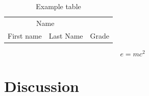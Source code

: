 \documentclass[a4paper,12pt]{article}
\begin{document}
\begin{table}[H]
\caption{Example table}
\centering
\begin{tabular}{llr}
\toprule
\multicolumn{2}{c}{Name} \\
\cmidrule(r){1-2}
First name & Last Name & Grade \\
\midrule
\bottomrule
\end{tabular}
\end{table}


\begin{equation}
\label{eq:emc}
e = mc^2
\end{equation}



\section{Discussion}


\clearpage
%







\end{document}
